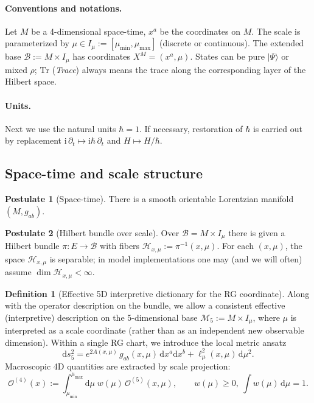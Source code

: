 \documentclass[11pt,a4paper]{article}
\newcommand{\ii}{\mathrm{i}}
\newcommand{\dd}{\mathrm{d}}
\theoremstyle{definition}
\newtheorem{definition}{Definition}[section]
\newtheorem{axiom}{Postulate}[section]
\theoremstyle{plain}
\theoremstyle{remark}
\begin{document}
\paragraph{Conventions and notations.}

Let $M$ be a 4-dimensional space-time, $x^a$ be the coordinates on $M$.
The scale is parameterized by $\mu\in I_\mu:=[\mu_{\min},\mu_{\max}]$ (discrete or continuous).
The extended base $\mathcal B := M\times I_\mu$ has coordinates $X^M=(x^a,\mu)$.
States can be pure $|\Psi\rangle$ or mixed $\rho$; $\mathrm{Tr}$ (\textit{Trace}) always means the trace along the corresponding layer of the Hilbert space.
\paragraph{Units.}

Next we use the natural units $\hbar=1$.
If necessary, restoration of $\hbar$ is carried out by replacement
$\ii\,\partial_t \mapsto \ii\hbar\,\partial_t$ and $H\mapsto H/\hbar$.

\subsection{Space-time and scale structure}
\label{sec:axioms:structure}

\begin{axiom}[Space-time]\label{ax:spacetime}
There is a smooth orientable Lorentzian manifold $(M,g_{ab})$.
\end{axiom}

\begin{axiom}[Hilbert bundle over scale]\label{ax:hilbertbundle}
Over $\mathcal B=M\times I_\mu$ there is given a Hilbert bundle $\pi:E\to\mathcal B$ with fibers
$\mathcal H_{x,\mu}:=\pi^{-1}(x,\mu)$.
For each $(x,\mu)$, the space $\mathcal H_{x,\mu}$ is separable; in model implementations one may (and we will often) assume
$\dim\mathcal H_{x,\mu}<\infty$.
\end{axiom}

\begin{definition}[Effective 5D interpretive dictionary for the RG coordinate]\label{ax:5dRG}
Along with the operator description on the bundle, we allow a consistent effective (interpretive) description
on the 5-dimensional base
$\mathcal M_5:=M\times I_\mu$,
where $\mu$ is interpreted as a scale coordinate (rather than as an independent new observable dimension).
Within a single RG chart, we introduce the local metric ansatz
\begin{equation}\label{eq:metric5d_ansatz}
\dd s_5^2
=
e^{2A(x,\mu)}\,g_{ab}(x,\mu)\,\dd x^a\dd x^b
+\ell_\mu^2(x,\mu)\,\dd\mu^2.
\end{equation}
Macroscopic 4D quantities are extracted by scale projection:
\begin{equation}\label{eq:proj5d_to_4d}
\mathcal O^{(4)}(x)
:=
\int_{\mu_{\min}}^{\mu_{\max}}\dd\mu\;w(\mu)\,\mathcal O^{(5)}(x,\mu),
\qquad
w(\mu)\ge 0,\ \int w(\mu)\,\dd\mu=1.
\end{equation}
\end{definition}
\end{document}
